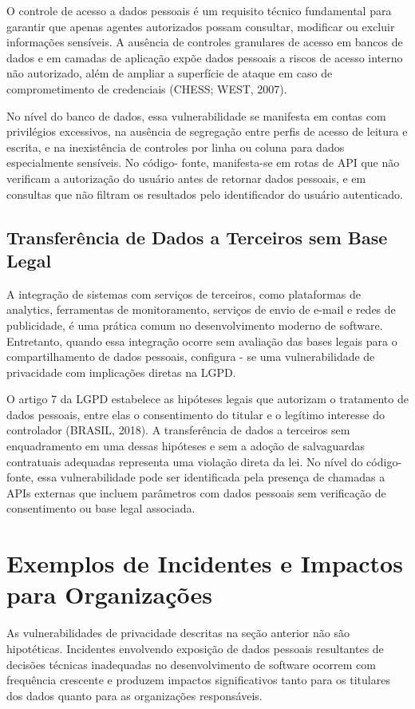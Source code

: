 \documentclass[oneside]{normas-utf-tex}
\begin{document}
O controle de acesso a dados pessoais é um requisito técnico fundamental para garantir que apenas agentes autorizados possam consultar, modificar ou excluir informações sensíveis. A ausência de controles granulares de acesso em bancos de dados e em camadas de aplicação expõe dados pessoais a riscos de acesso interno não autorizado, além de ampliar a superfície de ataque em caso de comprometimento de credenciais (CHESS; WEST, 2007).

No nível do banco de dados, essa vulnerabilidade se manifesta em contas com privilégios excessivos, na ausência de segregação entre perfis de acesso de leitura e escrita, e na inexistência de controles por linha ou coluna para dados especialmente sensíveis. No código- fonte, manifesta-se em rotas de API que não verificam a autorização do usuário antes de retornar dados pessoais, e em consultas que não filtram os resultados pelo identificador do usuário autenticado.

\subsection{Transferência de Dados a Terceiros sem Base Legal}

A integração de sistemas com serviços de terceiros, como plataformas de analytics, ferramentas de monitoramento, serviços de envio de e-mail e redes de publicidade, é uma prática comum no desenvolvimento moderno de software. Entretanto, quando essa integração ocorre sem avaliação das bases legais para o compartilhamento de dados pessoais, configura - se uma vulnerabilidade de privacidade com implicações diretas na LGPD.

O artigo 7 da LGPD estabelece as hipóteses legais que autorizam o tratamento de dados pessoais, entre elas o consentimento do titular e o legítimo interesse do controlador (BRASIL, 2018). A transferência de dados a terceiros sem enquadramento em uma dessas hipóteses e sem a adoção de salvaguardas contratuais adequadas representa uma violação direta da lei. No nível do código-fonte, essa vulnerabilidade pode ser identificada pela presença de chamadas a APIs externas que incluem parâmetros com dados pessoais sem verificação de consentimento ou base legal associada.

\section{Exemplos de Incidentes e Impactos para Organizações}

As vulnerabilidades de privacidade descritas na seção anterior não são hipotéticas. Incidentes envolvendo exposição de dados pessoais resultantes de decisões técnicas inadequadas no desenvolvimento de software ocorrem com frequência crescente e produzem impactos significativos tanto para os titulares dos dados quanto para as organizações responsáveis.
\end{document}
